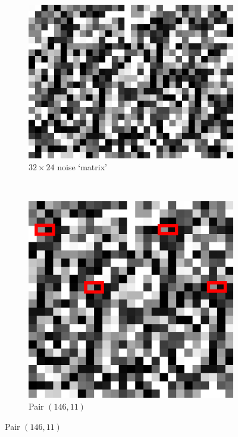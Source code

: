 \documentclass{llncs}
\begin{document}
\begin{figure}
\centering
\begin{subfigure}[t]{0.35\textwidth}
\centering
\includegraphics[scale=.25]{img/Garamond-I.png}
\caption{$32\times 24$ noise `matrix'}
\label{fig-example1a}
\end{subfigure}%
~
\begin{subfigure}[t]{0.20\textwidth}
\centering
\includegraphics[scale=.25]{img/Garamond-I-highlight.png}
\caption{Pair $(146,11)$}
\label{fig-example1b}

\end{subfigure}
\end{figure}
\end{document}
